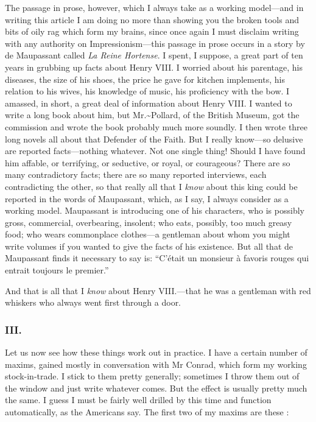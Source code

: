 The passage in prose, however, which I always take as a working
model---and in writing this article I am doing no more than showing you
the broken tools and bits of oily rag which form my brains, since once
again I must disclaim writing with any authority on Impressionism---this
passage in prose occurs in a story by de Maupassant called \emph{La
Reine Hortense}. I spent, I suppose, a great part of ten years in
grubbing up facts about Henry VIII. I worried about his parentage, his
diseases, the size of his shoes, the price he gave for kitchen
implements, his relation to his wives, his knowledge of music, his
proficiency with the bow. I amassed, in short, a great deal of
information about Henry VIII. I wanted to write a long book about him,
but Mr.\textasciitilde{}Pollard, of the British Museum, got the
commission and wrote the book probably much more soundly. I then wrote
three long novels all about that Defender of the Faith. But I really
know---so delusive are reported facts---nothing whatever. Not one single
thing! Should I have found him affable, or terrifying, or seductive, or
royal, or courageous? There are so many contradictory facts; there are
so many reported interviews, each contradicting the other, so that
really all that I \emph{know} about this king could be reported in the
words of Maupassant, which, as I say, I always consider as a working
model. Maupassant is introducing one of his characters, who is possibly
gross, commercial, overbearing, insolent; who eats, possibly, too much
greasy food; who wears commonplace clothes---a gentleman about whom you
might write volumes if you wanted to give the facts of his existence.
But all that de Maupassant finds it necessary to say is: ``C'était un
monsieur à favoris rouges qui entrait toujours le premier.''

And that is all that I \emph{know} about Henry VIII.---that he was a
gentleman with red whiskers who always went first through a door.

\subsubsection{III.}\label{iii.}

Let us now see how these things work out in practice. I have a certain
number of maxims, gained mostly in conversation with Mr Conrad, which
form my working stock-in-trade. I stick to them pretty generally;
sometimes I throw them out of the window and just write whatever comes.
But the effect is usually pretty much the same. I guess I must be fairly
well drilled by this time and function automatically, as the Americans
say. The first two of my maxims are these :

